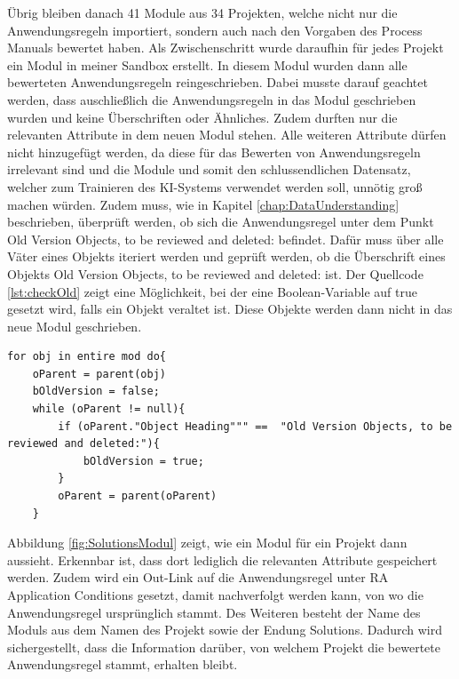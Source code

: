 Übrig bleiben danach 41 Module aus 34 Projekten, welche nicht nur die Anwendungsregeln importiert, sondern auch nach den Vorgaben des Process Manuals bewertet haben. Als Zwischenschritt wurde daraufhin
für jedes Projekt ein Modul in meiner Sandbox erstellt. In diesem Modul wurden dann alle bewerteten Anwendungsregeln reingeschrieben. Dabei musste darauf geachtet werden, dass auschließlich die
Anwendungsregeln in das Modul geschrieben wurden und keine Überschriften oder Ähnliches. Zudem durften nur die relevanten Attribute in dem neuen Modul stehen. Alle weiteren Attribute dürfen nicht
hinzugefügt werden, da diese für das Bewerten von Anwendungsregeln irrelevant sind und die Module und somit den schlussendlichen Datensatz, welcher zum Trainieren des KI-Systems verwendet werden soll,
unnötig groß machen würden. Zudem muss, wie in Kapitel \ref*{chap:DataUnderstanding} beschrieben, überprüft werden, ob sich die Anwendungsregel unter dem Punkt 
\glqq Old Version Objects, to be reviewed and deleted: \grqq{} befindet. Dafür muss über alle Väter eines Objekts iteriert werden und geprüft werden, ob die Überschrift eines Objekts 
\glqq Old Version Objects, to be reviewed and deleted: \grqq{} ist. Der Quellcode \ref*{lst:checkOld} zeigt eine Möglichkeit, bei der eine Boolean-Variable auf true gesetzt wird, falls ein Objekt
veraltet ist. Diese Objekte werden dann nicht in das neue Modul geschrieben.

\begin{lstlisting}[caption={Prüfen, ob Objekt veraltet ist}, captionpos=b, label = lst:checkOld] 
for obj in entire mod do{ 
    oParent = parent(obj)
    bOldVersion = false;
    while (oParent != null){
        if (oParent."Object Heading""" ==  "Old Version Objects, to be reviewed and deleted:"){
            bOldVersion = true;
        }
        oParent = parent(oParent)
    }
\end{lstlisting}

Abbildung \ref*{fig:SolutionsModul} zeigt, wie ein Modul für ein Projekt dann aussieht. Erkennbar ist, dass dort lediglich die relevanten Attribute gespeichert werden. Zudem wird ein Out-Link auf die
Anwendungsregel unter RA Application Conditions gesetzt, damit nachverfolgt werden kann, von wo die Anwendungsregel ursprünglich stammt. Des Weiteren besteht der Name des Moduls aus dem Namen
des Projekt sowie der Endung \glqq {} Solutions\grqq{}. Dadurch wird sichergestellt, dass die Information darüber, von welchem Projekt die bewertete Anwendungsregel stammt, erhalten bleibt.

